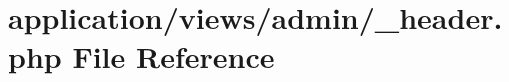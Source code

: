 \hypertarget{admin_2__header_8php}{\section{application/views/admin/\-\_\-header.php File Reference}
\label{admin_2__header_8php}
}
